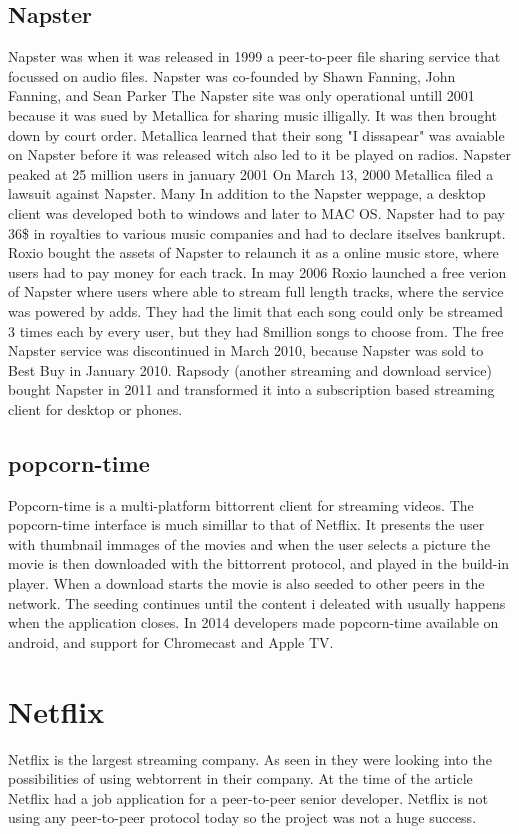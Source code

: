 \subsection{Napster}
Napster was when it was released in 1999 a peer-to-peer file sharing service that focussed on audio files. Napster was co-founded by Shawn Fanning, John Fanning, and Sean Parker The Napster site was only operational untill 2001 because it was sued by Metallica for sharing music illigally. It was then brought down by court order. Metallica learned that their song "I dissapear" was avaiable on Napster before it was released witch also led to it be played on radios. Napster peaked at 25 million users in january 2001 On March 13, 2000 Metallica filed a lawsuit against Napster. Many  In addition to the Napster weppage, a desktop client was developed both to windows and later to MAC OS.
Napster had to pay 36\$ in royalties to various music companies and had to declare itselves bankrupt. Roxio bought the assets of Napster to relaunch it as a online music store, where users had to pay money for each track. In may 2006 Roxio launched a free verion of Napster where users where able to stream full length tracks, where the service was powered by adds. They had the limit that each song could only be streamed 3 times each by every user, but they had 8million songs to choose from.
The free Napster service was discontinued in March 2010, because Napster was sold to Best Buy in January 2010.
Rapsody (another streaming and download service) bought Napster in 2011 and transformed it into a subscription based streaming client for desktop or phones.

\subsection{popcorn-time}
Popcorn-time is a multi-platform bittorrent client for streaming videos. The popcorn-time interface is much simillar to that of Netflix. It presents the user with thumbnail immages of the movies and when the user selects a picture the movie is then downloaded with the bittorrent protocol, and played in the build-in player.
 When a download starts the movie is also seeded to other peers in the network. The seeding continues until the content i deleated with usually happens when the application closes.
 In 2014 developers made popcorn-time available on android, and support for Chromecast and Apple TV.

\section{Netflix}
Netflix is the largest streaming company. As seen in \citep{netflix} they were looking into the possibilities of using webtorrent in their company. At the time of the article Netflix had a job application for a peer-to-peer senior developer. Netflix is not using any peer-to-peer protocol today so the project was not a huge success.

